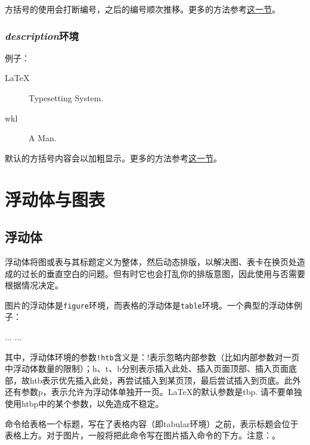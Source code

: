 {方括号的使用会打断编号，之后的编号顺次推移。更多的方法参考\hyperref[sec:list]{这一节}。

\subsubsection{\textit{description}环境}
例子：

\begin{codeshow}
\begin{description}
  \item[LaTeX] Typesetting System.
  \item[wkl] A Man.
\end{description}
\end{codeshow}

默认的方括号内容会以加粗显示。更多的方法参考\hyperref[sec:list]{这一节}。

\section{浮动体与图表}
\label{sec:float}

\subsection{浮动体}
浮动体将图或表与其标题定义为整体，然后动态排版，以解决图、表卡在换页处造成的过长的垂直空白的问题。但有时它也会打乱你的排版意图，因此使用与否需要根据情况决定。

图片的浮动体是\texttt{figure}环境，而表格的浮动体是\texttt{table}环境。一个典型的浮动体例子：
\begin{latex}{}
\begin{table}[!htb]
  \begin{center}
    \caption{table-cap}
    \label{table-name}
    \begin{tabular}{...}
      ...
    \end{tabular}
  \end{center}
\end{table}
\end{latex}

其中，浮动体环境的参数\verb|!htb|含义是：!表示忽略内部参数（比如内部参数对一页中浮动体数量的限制）；h、t、b分别表示插入此处、插入页面顶部、插入页面底部，故htb表示优先插入此处，再尝试插入到某页顶，最后尝试插入到页底。此外还有参数p，表示允许为浮动体单独开一页。\LaTeX 的默认参数是tbp. 请不要单独使用htbp中的某个参数，以免造成不稳定。

\latexline{\\caption}命令给表格一个标题，写在了表格内容（即tabular环境）之前，表示标题会位于表格上方。对于图片，一般将把此命令写在图片插入命令的下方。注意：。\dpar

}

